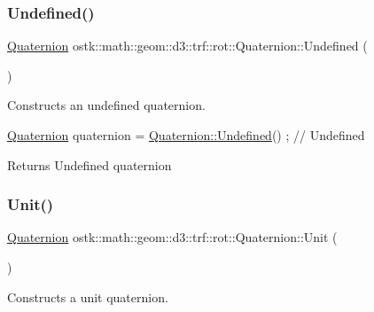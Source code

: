 \subsubsection{\texorpdfstring{Undefined()}{Undefined()}}
{\footnotesize\ttfamily \hyperlink{classostk_1_1math_1_1geom_1_1d3_1_1trf_1_1rot_1_1_quaternion}{Quaternion} ostk\+::math\+::geom\+::d3\+::trf\+::rot\+::\+Quaternion\+::\+Undefined (\begin{DoxyParamCaption}{ }\end{DoxyParamCaption})\hspace{0.3cm}{\ttfamily [static]}}



Constructs an undefined quaternion. 


\begin{DoxyCode}
\hyperlink{classostk_1_1math_1_1geom_1_1d3_1_1trf_1_1rot_1_1_quaternion_ad9fd7d8eb5effb4d4e0394bbb5bb86dc}{Quaternion} quaternion = \hyperlink{classostk_1_1math_1_1geom_1_1d3_1_1trf_1_1rot_1_1_quaternion_a10a7b9bd6bcbcdfe83e304589684c324}{Quaternion::Undefined}() ; \textcolor{comment}{// Undefined}
\end{DoxyCode}


\begin{DoxyReturn}{Returns}
Undefined quaternion 
\end{DoxyReturn}
\mbox{\label{classostk_1_1math_1_1geom_1_1d3_1_1trf_1_1rot_1_1_quaternion_ad408cbb3545268b2815c15f12abdbc8b}} 
\subsubsection{\texorpdfstring{Unit()}{Unit()}}
{\footnotesize\ttfamily \hyperlink{classostk_1_1math_1_1geom_1_1d3_1_1trf_1_1rot_1_1_quaternion}{Quaternion} ostk\+::math\+::geom\+::d3\+::trf\+::rot\+::\+Quaternion\+::\+Unit (\begin{DoxyParamCaption}{ }\end{DoxyParamCaption})\hspace{0.3cm}{\ttfamily [static]}}



Constructs a unit quaternion. 


